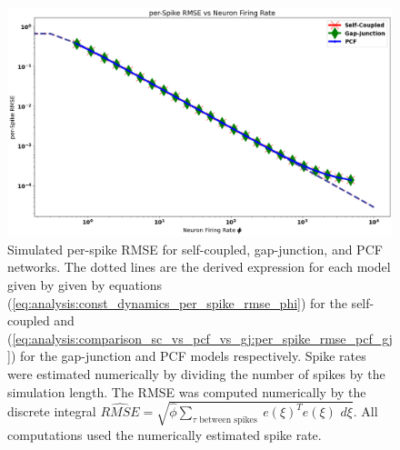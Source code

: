 \begin{figure}
\centering
\includegraphics[width=\linewidth]{figures/per_spike_rmse_vs_phi_sc_gj_pcf}
\caption{Simulated per-spike RMSE for self-coupled, gap-junction, and PCF networks. The dotted lines are the derived expression for each model given by given by equations (\ref{eq:analysis:const_dynamics_per_spike_rmse_phi}) for the self-coupled and (\ref{eq:analysis:comparison_sc_vs_pcf_vs_gj:per_spike_rmse_pcf_gj}) for the gap-junction and PCF models respectively. Spike rates were estimated numerically by dividing the number of spikes by the simulation length. The RMSE was computed numerically by the discrete integral $\hat{RMSE} = \sqrt{\hat{\phi} \sum_{\tau \text{ between spikes }} e(\xi)^T e(\xi) \, \, d\xi }$. All computations used the numerically estimated spike rate.} 
\label{fig:analysis:comparison_sc_vs_pcf_vs_gj:per_spike_rmse_sc_pcf_gj}
\end{figure}

